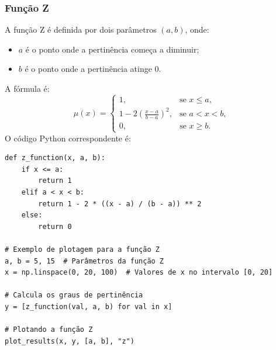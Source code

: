 \documentclass[a4paper,12pt]{article}
\begin{document}
\subsubsection{Função Z}
A função Z é definida por dois parâmetros $(a, b)$, onde:
\begin{itemize}
    \item $a$ é o ponto onde a pertinência começa a diminuir;
    \item $b$ é o ponto onde a pertinência atinge 0.
\end{itemize}
A fórmula é:
\[
\mu(x) =
\begin{cases}
1, & \text{se } x \leq a, \\
1 - 2\left(\frac{x - a}{b - a}\right)^2, & \text{se } a < x < b, \\
0, & \text{se } x \geq b.
\end{cases}
\]
O código Python correspondente é:
\begin{verbatim}
def z_function(x, a, b):
    if x <= a:
        return 1
    elif a < x < b:
        return 1 - 2 * ((x - a) / (b - a)) ** 2
    else:
        return 0
        
# Exemplo de plotagem para a função Z
a, b = 5, 15  # Parâmetros da função Z
x = np.linspace(0, 20, 100)  # Valores de x no intervalo [0, 20]

# Calcula os graus de pertinência
y = [z_function(val, a, b) for val in x]

# Plotando a função Z
plot_results(x, y, [a, b], "z")


\end{verbatim}
\end{document}
